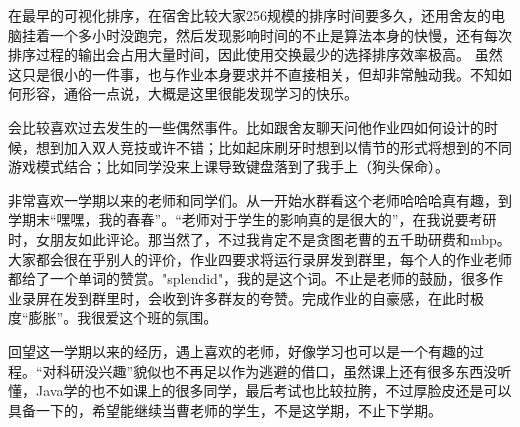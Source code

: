 \documentclass{SCIS2022cn}
\begin{document}
在最早的可视化排序，在宿舍比较大家256规模的排序时间要多久，还用舍友的电脑挂着一个多小时没跑完，然后发现影响时间的不止是算法本身的快慢，还有每次排序过程的输出会占用大量时间，因此使用交换最少的选择排序效率极高。
虽然这只是很小的一件事，也与作业本身要求并不直接相关，但却非常触动我。不知如何形容，通俗一点说，大概是这里很能发现学习的快乐。

会比较喜欢过去发生的一些偶然事件。比如跟舍友聊天问他作业四如何设计的时候，想到加入双人竞技或许不错；比如起床刷牙时想到以情节的形式将想到的不同游戏模式结合；比如同学没来上课导致键盘落到了我手上（狗头保命）。

非常喜欢一学期以来的老师和同学们。从一开始水群看这个老师哈哈哈真有趣，到学期末“嘿嘿，我的春春”。“老师对于学生的影响真的是很大的”，在我说要考研时，女朋友如此评论。那当然了，不过我肯定不是贪图老曹的五千助研费和mbp。
大家都会很在乎别人的评价，作业四要求将运行录屏发到群里，每个人的作业老师都给了一个单词的赞赏。"splendid"，我的是这个词。不止是老师的鼓励，很多作业录屏在发到群里时，会收到许多群友的夸赞。完成作业的自豪感，在此时极度“膨胀”。我很爱这个班的氛围。

回望这一学期以来的经历，遇上喜欢的老师，好像学习也可以是一个有趣的过程。“对科研没兴趣”貌似也不再足以作为逃避的借口，虽然课上还有很多东西没听懂，Java学的也不如课上的很多同学，最后考试也比较拉胯，不过厚脸皮还是可以具备一下的，希望能继续当曹老师的学生，不是这学期，不止下学期。






\end{document}
